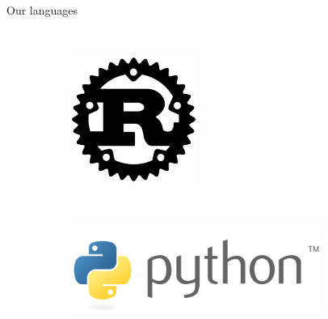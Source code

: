 \documentclass[NET,english,aspectratio=169,notitleframe]{tumbeamer}
\begin{document}
\begin{frame}{Our languages}
\begin{figure}
\begin{subfigure}[t]{0.2\columnwidth}
    \end{subfigure}
    ~ 
    \begin{subfigure}[t]{0.2\columnwidth}
        \centering
        \includegraphics[width=0.45\textwidth]{pics/rust}
    \end{subfigure}
    ~ 
    \begin{subfigure}[t]{0.3\columnwidth}
	\centering
        \includegraphics[width=0.9\textwidth]{pics/python}
    \end{subfigure}
\end{figure}
\end{frame}
\end{document}
